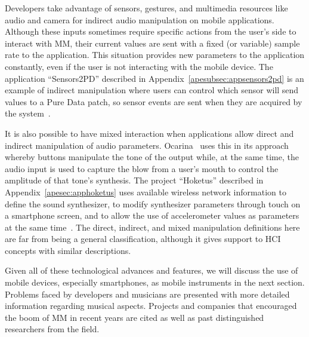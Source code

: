 Developers take advantage of sensors, gestures, and  multimedia resources like audio and camera for indirect audio manipulation on mobile applications.
Although these inputs sometimes require specific actions from the user's side to interact with MM, their current values are sent with a fixed (or variable) sample rate to the application.
This situation provides new parameters to the application constantly, even if the user is not interacting with the mobile device.
The application ``Sensors2PD'' described in Appendix~\ref{apesubsec:appsensors2pd} is an example of indirect manipulation where users can control which sensor will send values to a Pure Data patch, so sensor events are sent when they are acquired by the system~\citep{deCarvalhoJunior2014sensors2pd}.

It is also possible to have mixed interaction when applications allow direct and indirect manipulation of audio parameters.
Ocarina~\citep{Wang2014ocarina} uses this in its approach whereby buttons manipulate the tone of the output while, at the same time, the audio input is used to capture the blow from a user's mouth to control the amplitude of that tone's synthesis.
The project ``Hoketus'' described in Appendix~\ref{apesec:apphoketus} uses available wireless network information to define the sound synthesizer, to modify synthesizer parameters through touch on a smartphone screen, and to allow the use of accelerometer values as parameters at the same time~\citep{Bandeira2014notes,deCarvalhoJunior2015indoor}.
The direct, indirect, and mixed manipulation definitions here are far from being a general classification, although it gives support to HCI concepts with similar descriptions.

Given all of these technological advances and features, we will discuss the use of mobile devices, especially smartphones, as mobile instruments in the next section.
Problems faced by developers and musicians are presented with more detailed information regarding musical aspects.
Projects and companies that encouraged the boom of MM in recent years are cited as well as past distinguished researchers from the field.














